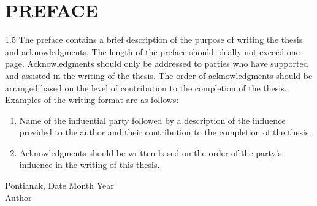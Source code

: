 \chapter*{PREFACE}
\begin{spacing}{1.5}
The preface contains a brief description of the purpose of writing the thesis and acknowledgments. The length of the preface should ideally not exceed one page. Acknowledgments should only be addressed to parties who have supported and assisted in the writing of the thesis. The order of acknowledgments should be arranged based on the level of contribution to the completion of the thesis. Examples of the writing format are as follows:

\begin{enumerate}
    \item Name of the influential party followed by a description of the influence provided to the author and their contribution to the completion of the thesis.
    \item Acknowledgments should be written based on the order of the party's influence in the writing of this thesis.
\end{enumerate}
\end{spacing}

\vspace{1cm}
\begin{flushright}
\begin{minipage}{5cm}
\begin{singlespace}
Pontianak, Date Month Year \\[1.5cm]
Author
\end{singlespace}
\end{minipage}
\end{flushright}
